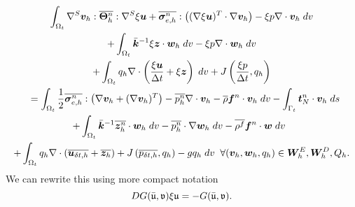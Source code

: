 \begin{multline}
\label{eqn:newton_mass}
\int_{\Omega_{t}} \nabla^{S} \boldsymbol{v}_{h} : \overline{\boldsymbol{\Theta}^{n}_{h}} : \nabla^{S} \xi\boldsymbol{u}  + \overline{\boldsymbol{\sigma}^{n}_{e,h}}:
            \left( (\nabla \xi\boldsymbol{u})^{T} \cdot \nabla \boldsymbol{v}_{h} \right)
 - {\xi p}  \nabla \cdot\boldsymbol{v}_{h} \; dv \\+ \int_{\Omega_{t}}  \bar{\boldsymbol{k}}^{-1} \xi\boldsymbol{z} \cdot \boldsymbol{w}_{h} \; dv -  \xi p  \nabla \cdot \boldsymbol{w}_{h} \;dv \\+ \int_{\Omega_{t}} {q}_{h} \nabla \cdot
       \left( \frac{\xi\boldsymbol{u}}{\Delta t } +  \xi\boldsymbol{z} \right)  \;dv
+ J\left(\frac{ \xi p }{\Delta t},{q}_{h}\right) \\
\quad = \int_{\Omega_{t}}
  \frac{1}{2} \overline{\boldsymbol{\sigma}^{n}_{e,h}}:
              \left( \nabla \boldsymbol{v}_{h} + (\nabla \boldsymbol{v}_{h})^{T} \right)
- \overline{p_{h}^{n}}  \nabla \cdot \boldsymbol{v}_{h}  - \overline{\rho} \boldsymbol{f}^{n} \cdot \boldsymbol{v}_{h} \; dv
- \int_{\Gamma_{t}}  \boldsymbol{t}_{N}^{n} \cdot \boldsymbol{v}_{h} \; ds \; \\ + \int_{\Omega_{t}}  \bar{\boldsymbol{k}}^{-1} \overline{\boldsymbol{z}_{h}^{n}} \cdot \boldsymbol{w}_{h} \; dv -     \overline{p_{h}^{n}} \cdot \nabla \boldsymbol{w}_{h} \;dv -  \overline{\rho^{f}} \boldsymbol{f}^{n} \cdot \boldsymbol{w} \; dv \;\; \\ + \int_{\Omega_{t}}
         {q}_{h} \nabla \cdot ( \overline{{\boldsymbol{u}_{\delta t,h}}} + \overline{\boldsymbol{z}_{h}} )
         + J\left(\overline{{{p}_{\delta t,h}}},{q}_{h}\right) - g   {q}_{h} \; dv  \;\; \forall (\boldsymbol{v}_{h},\boldsymbol{w}_{h},{q}_{h} )\in\boldsymbol{W}^{E}_{h},\boldsymbol{W}^{D}_{h},{Q}_{h}.
\end{multline} 
We can rewrite this using more compact notation
\begin{equation}
 DG(\bar{\mathfrak{u}},{\mathfrak{v}}) {\xi \mathfrak{u}} = - G(\bar{\mathfrak{u}},{\mathfrak{v}}).
\end{equation}


%
